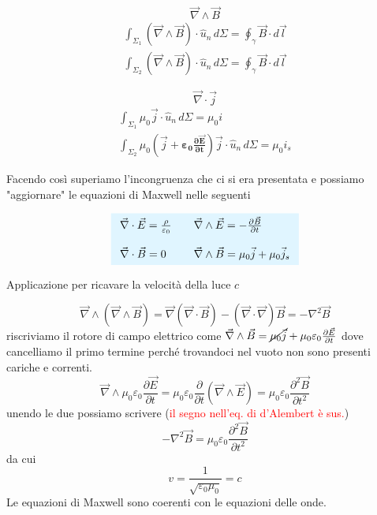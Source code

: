 \documentclass[x11names]{report}
\newcommand{\esempio}[2]{
	\begin{es}{#1}
		#2
	\end{es}
}
\newcommand{\viola}[1]{%
	\colorbox{myblue}{$\displaystyle #1$}
}
\begin{document}
\begin{minipage}{0.5\textwidth}
	\[
	\boxed{\vec{\nabla}\wedge \vec{B}}
	\]
	\begin{gather*}
		\int_{\Sigma_1}\left(\vec{\nabla}\wedge \vec{B}\right)\cdot \hat{u}_n \, d\Sigma = \oint_\gamma \vec{B} \cdot d\vec{l} \\
		\int_{\Sigma_2}\left(\vec{\nabla}\wedge \vec{B}\right)\cdot \hat{u}_n \, d\Sigma = \oint_\gamma \vec{B} \cdot d\vec{l}
	\end{gather*}
\end{minipage}
\begin{minipage}{0.5\textwidth}
	\[
	\boxed{\vec{\nabla}\cdot \vec{j}}
	\]
	\begin{gather*}
		\int_{\Sigma_1} \mu_0 \vec{j} \cdot \hat{u}_n \, d\Sigma = \mu_0 i \\
		\int_{\Sigma_2} \mu_0\left(\vec{j} + \boldsymbol{\varepsilon_0\frac{\partial\vec{E}}{\partial t}}\right) \vec{j} \cdot \hat{u}_n \, d\Sigma = \mu_0 i_s
	\end{gather*}
\end{minipage}\vspace{0.8cm}
Facendo così superiamo l'incongruenza che ci si era presentata e possiamo "aggiornare" le equazioni di Maxwell nelle seguenti

\begin{equation}
	\viola{
		\begin{array}{lcl}
			\vec{\nabla}\cdot \vec{E} = \frac{\rho}{\varepsilon_0} & & \vec{\nabla}\wedge \vec{E} = -\frac{\partial \vec{B}}{\partial t} \\ \\
			\vec{\nabla}\cdot \vec{B} = 0 & & \vec{\nabla}\wedge \vec{B} = \mu_0 \vec{j} + \mu_0\vec{j}_s
	\end{array}}
\end{equation}
\esempio{Applicazione per ricavare la velocità della luce \(c\)}{
\[
\vec{\nabla}\wedge\left(\vec{\nabla} \wedge\vec{B}\right) = \vec{\nabla}\left(\vec{\nabla}\cdot\vec{B}\right) - \left(\vec{\nabla}\cdot\vec{\nabla}\right)\vec{B} = -\nabla^2\vec{B}
\]
riscriviamo il rotore di campo elettrico come \(\vec{\nabla} \wedge\vec{B} = \cancel{\mu_0\vec{j}} + \mu_0\varepsilon_0\frac{\partial \vec{E}}{\partial t}\) dove cancelliamo il primo termine perché trovandoci nel vuoto non sono presenti cariche e correnti.
\[
 \vec{\nabla}\wedge\mu_0\varepsilon_0\frac{\partial \vec{E}}{\partial t} = \mu_0\varepsilon_0\frac{\partial}{\partial t}\left(\vec{\nabla}\wedge\vec{E}\right) = \mu_0\varepsilon_0\frac{\partial^2 \vec{B}}{\partial t^2}
\]
unendo le due possiamo scrivere (\textcolor{red}{il segno nell'eq. di d'Alembert è sus.})
\begin{equation}
	-\nabla^2\vec{B} =  \mu_0\varepsilon_0\frac{\partial^2 \vec{B}}{\partial t^2}
\end{equation}
da cui
\[
v = \frac{1}{\sqrt{\varepsilon_0\mu_0}} = c
\]
Le equazioni di Maxwell sono coerenti con le equazioni delle onde.
}
\end{document}
